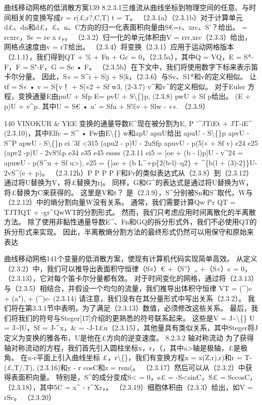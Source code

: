 \documentclass[UTF8,11pt,a4paper,openany,fontset=fandol]{ctexbook}
\begin{document}
曲线移动网格的低消散方案139 8.2.3.1三维流从曲线坐标到物理空间的任意、与时间相关的变换写成r = r(£,r?,C,T) t = T。 （2.3.1a）（2.3.1b）对于计算单元d£、dn和d£，£、n、C方向的归一化表面积向量由S€=r、xrc、S'？给出。 = rcxrc，Sc = re x r，。 （2.3.2）归一化的单元体积由V = rrr,xrc（2.3.3）给出，网格点速度由v = rT给出。 （2.3.4）将变换（2.3.1）应用于运动网格版本（2.1.1），我们得到QT + \% + Fn + Gc = 0，（2.3.5a），其中Q = VQ，E = S*-F，F = S"-F，G = Sc • F。 （2.3.5b）在下文中，我们将使用数字下标来表示笛卡尔分量。 因此，S« = S\textasciicircum{}i + S|j + S|k，（2.3.6）与Sv、S1*和v的定义相似。 让tf = S« • v = S\{v！ + S|«2 + Sf w3, (2-3.7) v\textasciicircum{}和v\textasciicircum{}的定义相似。 对于Euler 方程，变换通量E由puU + Sfp E= pvU + S\textbackslash\{\}p, (2.3.8) pwU + Sf p给出。 (E + p)U + v\textasciicircum{}p. 其中U = S€ • u' = Sfu + S\%v + Slw - ««. （2.3.9）

140 VINOKUR \& YEE 变换的通量导数E\textasciicircum{}现在被分割为E, P '\textasciicircum{}JTiEt + JT-iE\textasciicircum{} (2.3.10)，其中Elfc = S\textasciicircum{} • Fw由E\textbackslash\{\} w和apU apuU给出 apuU - S\textbackslash\{\}p apvU - S\textasciicircum{}P apwU - S\textbackslash\{\}p ei '3f <315 (apu2 - p)U - 2uSfp apuvU - p(5|« + Sf v) e24 e25 (apv2 -p)U - 2vS\%p e34 e35 e45 essss (2.3.11 ei5 = [oe + (b - l)p]U - v\textasciicircum{}24 = apuwU - p(S\textasciicircum{}u + Sf u>), e25 = \{[ae + (b L\textasciicircum{}+p\{2(b-l)--q2\} + \textasciicircum{}\{b(l + (3)-2\}\}U-2vS\textasciicircum{}(e + p)。 （2.3.12h）P P P P F和Fv的类似表达式从（2.3.8）到（2.3.12）通过将U替换为V，将£替换为rj。 同样，G和G\textasciicircum{}的表达式是通过将U替换为W，将£替换为C来获得的。 这里是V和t？ 是（2.3.9），S\textasciicircum{}分别被Sn和S\textasciicircum{}取代，W与（2.2.12）中的熵分割向量W没有关系。 通常，我们需要计算Qw f°r QT = TJTIQT + -gr\textasciicircum{}QwWT的分割形式。 然而，我们只考虑应用时间离散化的半离散方法。 除了使用非黏性通量导数E\textasciicircum{}、Fn和GQ的拆分形式外，我们不必使用QT的拆分形式来实现。 因此，半离散熵分割方法的最终形式仍然可以用保守和原始来表达

曲线移动网格141个变量的低消散方案，使现有计算机代码实现简单高效。 从定义（2.3.2）中，我们可以推导出表面积守恒律（S«）€ +（S”）„ +（S«）c = 0，（2.3.13），它对每个笛卡尔分量都有效。 对于时间变化的网格，通过将（2.3.13）与（2.3.5）相结合，并假设一个均匀的流量，我们推导出体积守恒律 VT = (\textasciicircum{})c + (a"), + (\textasciicircum{})c- (2.3.14) 请注意，我们没有在其分量形式中写出关系（2.3.2）。 我们将在第3.3.1节中表明，为了满足（2.3.13）数值，必须修改这些关系。 最后，我们将我们的符号与Steger[17]介绍的更熟悉的符号联系起来。 这些是V = J\textasciitilde{}\textbackslash\{\} U = J\textasciitilde{}lU，Sf = J-\textasciicircum{}x，\& = -J-1£u（2.3.15），其他量具有类似关系，其中Steger将J定义为变换的雅各布，U是他在£方向的逆变速度。 8.2.3.2 轴对称流动 为了获得轴对称流动的方程，我们首先引入圆柱坐标x，r，（，其中a>轴是极轴，£是极角。 在x-r平面上引入曲线坐标 £，r\textbackslash\{\}，我们有变换方程x = x(Z,r),r)和r = T-(£,T/,T), (2.3.16)和y - r cosC和z = rsm(。 （2.3.17）然后可以从（2.3.2）中获得表面积向量。 特别是，S\textasciicircum{}的成分变成S< = 0，s£ = -S<sinC，S£ = SccosC，（2.3.18），其中5C = x\textasciicircum{} - r\textasciicircum{}Xr，。 （2.3.19）细胞体积由（2.3.3）给出，如V = rSc。 （2.3.20）
\end{document}
